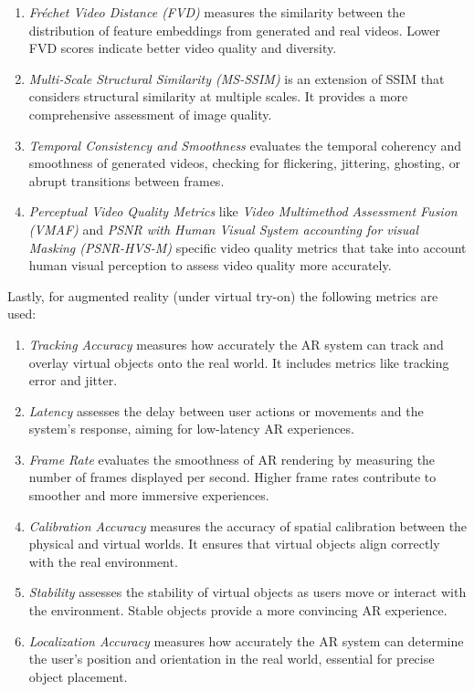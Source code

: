 		\begin{enumerate}
			\item \textit{Fréchet Video Distance (FVD)} measures the similarity between the distribution of feature embeddings from generated and real videos. Lower FVD scores indicate better video quality and diversity.
			\item \textit{Multi-Scale Structural Similarity (MS-SSIM)} is an extension of SSIM that considers structural similarity at multiple scales. It provides a more comprehensive assessment of image quality.
			\item \textit{Temporal Consistency and Smoothness} evaluates the temporal coherency and smoothness of generated videos, checking for flickering, jittering, ghosting, or abrupt transitions between frames.
			\item \textit{Perceptual Video Quality Metrics} like \textit{Video Multimethod Assessment Fusion (VMAF)} and \textit{PSNR with Human Visual System accounting for visual Masking (PSNR-HVS-M)} specific video quality metrics that take into account human visual perception to assess video quality more accurately.
		\end{enumerate}

		Lastly, for augmented reality (under virtual try-on) the following metrics are used:

		\begin{enumerate}
			\item \textit{Tracking Accuracy} measures how accurately the AR system can track and overlay virtual objects onto the real world. It includes metrics like tracking error and jitter.
			\item \textit{Latency} assesses the delay between user actions or movements and the system's response, aiming for low-latency AR experiences.
			\item \textit{Frame Rate} evaluates the smoothness of AR rendering by measuring the number of frames displayed per second. Higher frame rates contribute to smoother and more immersive experiences.
			\item \textit{Calibration Accuracy} measures the accuracy of spatial calibration between the physical and virtual worlds. It ensures that virtual objects align correctly with the real environment.
			\item \textit{Stability} assesses the stability of virtual objects as users move or interact with the environment. Stable objects provide a more convincing AR experience.
			\item \textit{Localization Accuracy} measures how accurately the AR system can determine the user's position and orientation in the real world, essential for precise object placement.
		\end{enumerate}